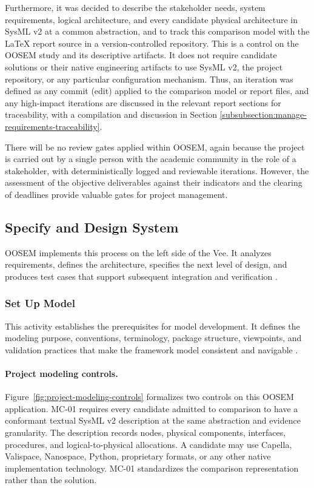 \documentclass[11pt,a4paper]{article}
\begin{document}
Furthermore, it was decided to describe the stakeholder needs, system requirements, logical architecture, and every candidate physical architecture in SysML v2 at a common abstraction, and to track this comparison model with the LaTeX report source in a version-controlled repository. This is a control on the OOSEM study and its descriptive artifacts. It does not require candidate solutions or their native engineering artifacts to use SysML v2, the project repository, or any particular configuration mechanism.
Thus, an iteration was defined as any commit (edit) applied to the comparison model or report files, and any high-impact iterations are discussed in the relevant report sections for traceability, with a compilation and discussion in Section \ref{subsubsection:manage-requirements-traceability}.

There will be no review gates applied within OOSEM, again because the project is carried out by a single person with the academic community in the role of a stakeholder, with deterministically logged and reviewable iterations.
However, the assessment of the objective deliverables against their indicators and the clearing of deadlines provide valuable gates for project management.

\subsection{Specify and Design System}
OOSEM implements this process on the left side of the Vee. It analyzes requirements, defines the architecture, specifies the next level of design, and produces test cases that support subsequent integration and verification \citep{friedenthal2014practical}.

\subsubsection{Set Up Model}
This activity establishes the prerequisites for model development. It defines the modeling purpose, conventions, terminology, package structure, viewpoints, and validation practices that make the framework model consistent and navigable \cite{friedenthal2014practical}.

\paragraph{Project modeling controls.}
Figure~\ref{fig:project-modeling-controls} formalizes two controls on this OOSEM application. MC-01 requires every candidate admitted to comparison to have a conformant textual SysML v2 description at the same abstraction and evidence granularity. The description records nodes, physical components, interfaces, procedures, and logical-to-physical allocations. A candidate may use Capella, Valispace, Nanospace, Python, proprietary formats, or any other native implementation technology. MC-01 standardizes the comparison representation rather than the solution.
\end{document}
